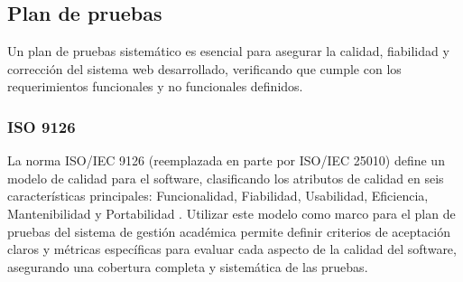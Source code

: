 \subsection{Plan de pruebas}
Un plan de pruebas sistemático es esencial para asegurar la calidad, fiabilidad y corrección del sistema web desarrollado, verificando que cumple con los requerimientos funcionales y no funcionales definidos.

\subsubsection{ISO 9126}
La norma ISO/IEC 9126 (reemplazada en parte por ISO/IEC 25010) define un modelo de calidad para el software, clasificando los atributos de calidad en seis características principales: Funcionalidad, Fiabilidad, Usabilidad, Eficiencia, Mantenibilidad y Portabilidad \parencite{ISO9126}.
Utilizar este modelo como marco para el plan de pruebas del sistema de gestión académica permite definir criterios de aceptación claros y métricas específicas para evaluar cada aspecto de la calidad del software, asegurando una cobertura completa y sistemática de las pruebas.
